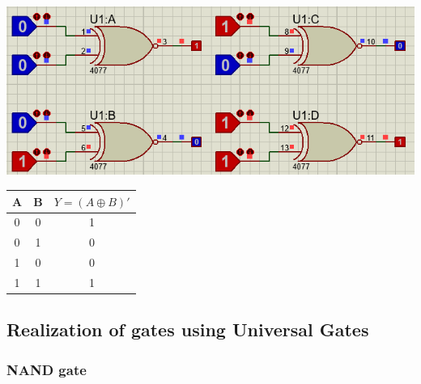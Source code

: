 \documentclass[a4paper, 12pt]{article}
\begin{document}
\begin{minipage}[c]{.7\textwidth}
  \centering
  \includegraphics[scale=0.5]{xnor}
\end{minipage}
\begin{minipage}{.3\textwidth}
  \begin{center}
    \begin{tabular}{ |c|c|c| }
      \hline
      A & B & $Y=(A\oplus B)'$ \\
      \hline
      0 & 0 & 1 \\
      \hline
      0 & 1 & 0 \\
      \hline
      1 & 0 & 0 \\
      \hline
      1 & 1 & 1 \\
      \hline
    \end{tabular}
  \end{center}
\end{minipage}

\subsection{Realization of gates using Universal Gates}

\subsubsection{NAND gate}
\end{document}
